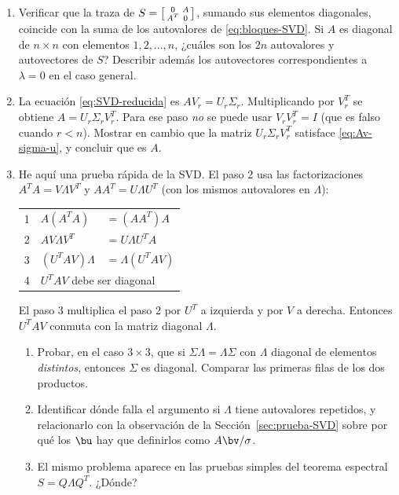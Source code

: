 \begin{enumerate}
\item\label{ej:bloques} Verificar que la traza de
$S=\begin{bsmallmatrix}0&A\\ A^T&0\end{bsmallmatrix}$, sumando sus elementos
diagonales, coincide con la suma de los autovalores de
\eqref{eq:bloques-SVD}. Si $A$ es diagonal de $n\times n$ con elementos
$1,2,\dots,n$, ¿cuáles son los $2n$ autovalores y autovectores de $S$?
Describir además los autovectores correspondientes a $\lambda=0$ en el caso
general.

\item\label{ej:reducida} La ecuación \eqref{eq:SVD-reducida} es
$AV_r=U_r\Sigma_r$. Multiplicando por $V_r^T$ se obtiene
$A=U_r\Sigma_rV_r^T$. Para ese paso \emph{no} se puede usar $V_rV_r^T=I$
(que es falso cuando $r<n$). Mostrar en cambio que la matriz
$U_r\Sigma_rV_r^T$ satisface \eqref{eq:Av-sigma-u}, y concluir que es $A$.

\item\label{ej:prueba-rapida} He aquí una prueba rápida de la SVD. El paso 2
usa las factorizaciones $A^TA=V\Lambda V^T$ y $AA^T=U\Lambda U^T$ (con los
mismos autovalores en $\Lambda$):
\begin{center}
\begin{tabular}{ll@{\quad}l}
\hline
1 & $A(A^TA)$ & $=(AA^T)A$\\
2 & $AV\Lambda V^T$ & $=U\Lambda U^TA$\\
3 & $(U^TAV)\Lambda$ & $=\Lambda(U^TAV)$\\
4 & \multicolumn{2}{l}{$U^TAV$ debe ser diagonal}\\
\hline
\end{tabular}
\end{center}
El paso 3 multiplica el paso 2 por $U^T$ a izquierda y por $V$ a derecha.
Entonces $U^TAV$ conmuta con la matriz diagonal $\Lambda$.
\begin{enumerate}[label=\textup{(\alph*)}]
\item Probar, en el caso $3\times3$, que si $\Sigma\Lambda=\Lambda\Sigma$ con
$\Lambda$ diagonal de elementos \emph{distintos}, entonces $\Sigma$ es
diagonal. Comparar las primeras filas de los dos productos.
\item Identificar dónde falla el argumento si $\Lambda$ tiene autovalores
repetidos, y relacionarlo con la observación de la
Sección~\ref{sec:prueba-SVD} sobre por qué los $\bu$ hay que definirlos como
$A\bv/\sigma$.
\item El mismo problema aparece en las pruebas simples del teorema espectral
$S=Q\Lambda Q^T$. ¿Dónde?
\end{enumerate}


\end{enumerate}
